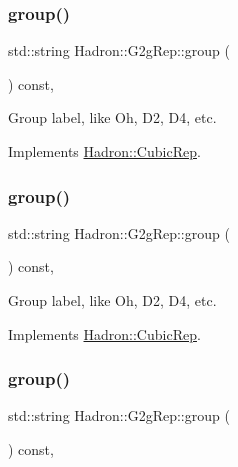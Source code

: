 \subsubsection{\texorpdfstring{group()}{group()}\hspace{0.1cm}{\footnotesize\ttfamily [1/3]}}
{\footnotesize\ttfamily std\+::string Hadron\+::\+G2g\+Rep\+::group (\begin{DoxyParamCaption}{ }\end{DoxyParamCaption}) const\hspace{0.3cm}{\ttfamily [inline]}, {\ttfamily [virtual]}}

Group label, like Oh, D2, D4, etc. 

Implements \mbox{\hyperlink{structHadron_1_1CubicRep_a0748f11ec87f387062c8e8981339a29c}{Hadron\+::\+Cubic\+Rep}}.

\mbox{\label{structHadron_1_1G2gRep_a37c28b88ae6f2d60b60465e5cc62126d}} 
\subsubsection{\texorpdfstring{group()}{group()}\hspace{0.1cm}{\footnotesize\ttfamily [2/3]}}
{\footnotesize\ttfamily std\+::string Hadron\+::\+G2g\+Rep\+::group (\begin{DoxyParamCaption}{ }\end{DoxyParamCaption}) const\hspace{0.3cm}{\ttfamily [inline]}, {\ttfamily [virtual]}}

Group label, like Oh, D2, D4, etc. 

Implements \mbox{\hyperlink{structHadron_1_1CubicRep_a0748f11ec87f387062c8e8981339a29c}{Hadron\+::\+Cubic\+Rep}}.

\mbox{\label{structHadron_1_1G2gRep_a37c28b88ae6f2d60b60465e5cc62126d}} 
\subsubsection{\texorpdfstring{group()}{group()}\hspace{0.1cm}{\footnotesize\ttfamily [3/3]}}
{\footnotesize\ttfamily std\+::string Hadron\+::\+G2g\+Rep\+::group (\begin{DoxyParamCaption}{ }\end{DoxyParamCaption}) const\hspace{0.3cm}{\ttfamily [inline]}, {\ttfamily [virtual]}}


